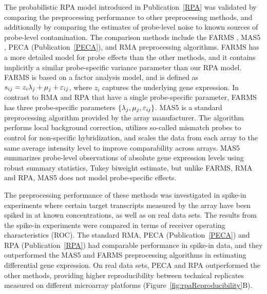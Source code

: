 The probabilistic RPA model introduced in Publication~\ref{RPA} was
validated by comparing the preprocessing performance to other
preprocessing methods, and additionally by comparing the estimates of
probe-level noise to known sources of probe-level contamination.  The
comparison methods include the FARMS \citep{Hochreiter06}, MAS5
\citep{Hubbell2002}, PECA (Publication~\ref{PECA}), and RMA
\citep{Irizarry03rma} preprocessing algorithms. FARMS has a more
detailed model for probe effects than the other methods, and it
contains implicitly a similar probe-specific variance parameter than
our RPA model. FARMS is based on a factor analysis model, and is
defined as \(s_{ij} = z_i \lambda_j + \mathbf{\mu}_j + \mathbf{\varepsilon}_{ij}\), where \(z_i\)
captures the underlying gene expression. In contrast to RMA and RPA
that have a single probe-specific parameter, FARMS has three
probe-specific parameters \(\{\lambda_j, \mathbf{\mu}_j, \mathbf{\varepsilon}_{ij}\}\). MAS5 is
a standard preprocessing algorithm provided by the array
manufacturer. The algorithm performs local background correction,
utilizes so-called mismatch probes to control for non-specific
hybridization, and scales the data from each array to the same average
intensity level to improve comparability across arrays. MAS5
summarizes probe-level observations of absolute gene expression levels
using robust summary statistics, Tukey biweight estimate, but unlike
FARMS, RMA and RPA, MAS5 does not model probe-specific effects.

The preprocessing performance of these methods was investigated in
spike-in experiments where certain target transcripts measured by the
array have been spiked in at known concentrations, as well as on real
data sets.  The results from the spike-in experiments were compared in
terms of receiver operating characteristics (ROC).  The standard RMA,
PECA (Publication~\ref{PECA}) and RPA (Publication~\ref{RPA}) had
comparable performance in spike-in data, and they outperformed the
MAS5 \citep{Hubbell2002} and FARMS \citep{Hochreiter06} preprocessing
algorithms in estimating differential gene expression. On real data
sets, PECA and RPA outperformed the other methods, providing higher
reproducibility between technical replicates measured on different
microarray platforms (Figure~\ref{fig:rpaReproducibility}B).

